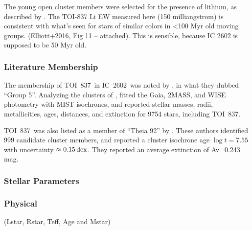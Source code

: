 \documentclass[12pt,twocolumn,tighten]{aastex62}
\newcommand{\tn}{TOI~837} %
\newcommand{\cn}{IC~2602} %
\begin{document}
The young open cluster members were selected for the presence of
lithium, as described by \citet{randich_gaiaeso_2018}.
The TOI-837 Li EW measured here (150 milliangstrom) is consistent
with what's seen for stars of similar colors in <100 Myr old moving
groups.
(Elliott+2016, Fig 11 -- attached).  This is sensible, because
IC 2602 is supposed to be 50 Myr old.



\subsubsection{Literature Membership}
The membership of \tn\ in \cn\ was noted by \citet{oh_comoving_2017},
in what they dubbed ``Group 5''.
Analyzing the clusters of \citet{oh_comoving_2017},
\citet{bochanski_fundamental_2018} fitted the Gaia, 2MASS, and
WISE photometry with MIST isochrones, and reported stellar masses,
radii, metallicities, ages, distances, and extinction for 9754 stars,
including \tn.
%


\tn\ was also listed as a member of ``Theia 92'' by
\citet{kounkel_untangling_2019}.
These authors identified 999 candidate cluster members, and
reported a cluster isochrone age $\log t = 7.55$ with uncertainty
$\approx 0.15\,{\rm dex}$.
They reported an average extinction of Av=0.243 mag.


\subsubsection{Stellar Parameters}



\subsubsection{Physical}
 (Lstar, Rstar, Teff, Age and Mstar)
\end{document}
